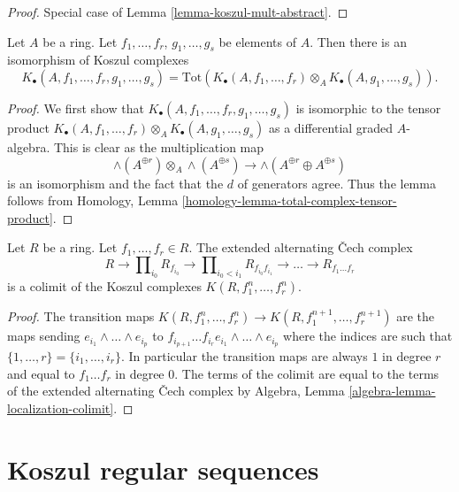 \begin{proof}
Special case of
Lemma \ref{lemma-koszul-mult-abstract}.
\end{proof}

\begin{lemma}
\label{lemma-join-sequences-koszul-complex}
Let $A$ be a ring.
Let $f_1, \ldots, f_r$, $g_1, \ldots, g_s$ be elements of $A$.
Then there is an isomorphism of Koszul complexes
$$
K_\bullet(A, f_1, \ldots, f_r, g_1, \ldots, g_s) =
\text{Tot}(K_\bullet(A, f_1, \ldots, f_r) \otimes_A
K_\bullet(A, g_1, \ldots, g_s)).
$$
\end{lemma}

\begin{proof}
We first show that $K_\bullet(A, f_1, \ldots, f_r, g_1, \ldots, g_s)$ is
isomorphic to the tensor product
$K_\bullet(A, f_1, \ldots, f_r) \otimes_A K_\bullet(A, g_1, \ldots, g_s)$
as a differential graded $A$-algebra. This is clear as the multiplication map
$$
\wedge(A^{\oplus r}) \otimes_A \wedge(A^{\oplus s})
\longrightarrow
\wedge(A^{\oplus r} \oplus A^{\oplus s})
$$
is an isomorphism and the fact that the $d$ of generators agree.
Thus the lemma follows from
Homology, Lemma \ref{homology-lemma-total-complex-tensor-product}.
\end{proof}

\begin{lemma}
\label{lemma-extended-alternating-Cech-is-colimit-koszul}
Let $R$ be a ring. Let $f_1, \ldots, f_r \in R$.
The extended alternating {\v C}ech complex
$$
R \to \prod\nolimits_{i_0} R_{f_{i_0}} \to
\prod\nolimits_{i_0 < i_1} R_{f_{i_0}f_{i_1}} \to
\ldots \to R_{f_1\ldots f_r}
$$
is a colimit of the Koszul complexes $K(R, f_1^n, \ldots, f_r^n)$.
\end{lemma}

\begin{proof}
The transition maps $K(R, f_1^n, \ldots, f_r^n) \to
K(R, f_1^{n + 1}, \ldots, f_r^{n + 1})$ are the maps
sending $e_{i_1} \wedge \ldots \wedge e_{i_p}$ to
$f_{i_{p + 1}} \ldots f_{i_r} e_{i_1} \wedge \ldots \wedge e_{i_p}$
where the indices are such that $\{1, \ldots, r\} = \{i_1, \ldots, i_r\}$.
In particular the transition maps are always $1$ in degree $r$
and equal to $f_1\ldots f_r$ in degree $0$.
The terms of the colimit are equal to the terms of the
extended alternating {\v C}ech complex by
Algebra, Lemma \ref{algebra-lemma-localization-colimit}.
\end{proof}




\section{Koszul regular sequences}
\label{section-koszul-regular}

